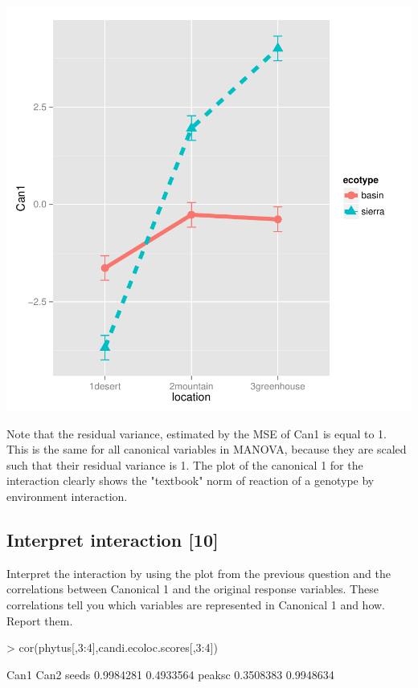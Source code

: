 \documentclass{article}
\begin{document}
\includegraphics{HW09MANOVA_DA-008}

Note that the residual variance, estimated by the MSE of Can1 is equal to 1. This is the same for all canonical variables in MANOVA, because they are scaled such that their residual variance is 1. The plot of the canonical 1 for the interaction clearly shows the "textbook" norm of reaction of a genotype by environment interaction.

\subsection{Interpret interaction [10]}

Interpret the interaction by using the plot from the previous question and the correlations between Canonical 1 and the original response variables. These correlations tell you which variables are represented in Canonical 1 and how. Report them.

\begin{Schunk}
\begin{Sinput}
> cor(phytus[,3:4],candi.ecoloc.scores[,3:4])
\end{Sinput}
\begin{Soutput}
            Can1      Can2
seeds  0.9984281 0.4933564
peaksc 0.3508383 0.9948634
\end{Soutput}
\end{Schunk}
\end{document}
